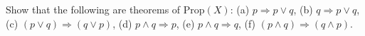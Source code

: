 Show that the following are theorems of $\text{Prop}(X)$:
(a) $p \Rightarrow p \lor q$,
(b) $q \Rightarrow p \lor q$,
(c) $(p \lor q) \Rightarrow (q \lor p)$,
(d) $p \land q \Rightarrow p$,
(e) $p \land q \Rightarrow q$,
(f) $(p \land q) \Rightarrow (q \land p)$.

